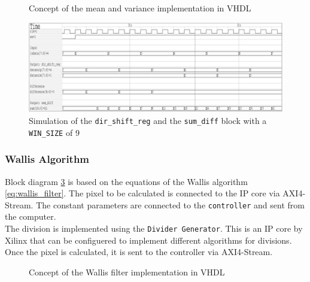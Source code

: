 \begin{figure}[tb!]
    \centering
    \begin{adjustbox}{max width=\textwidth, keepaspectratio}
        
    \end{adjustbox}
    \caption{Concept of the mean and variance implementation in VHDL}
    \label{fig:mean_var_vhdl}
\end{figure}

\begin{figure}[tb!]
    \centering
    \includegraphics[width=\textwidth]
    {images/image_processing/dir_shift_sum_diff.png}
    \caption{Simulation of the \texttt{dir\_shift\_reg} and the
    \texttt{sum\_diff} block with a \texttt{WIN\_SIZE} of 9}
    \label{fig:sim_shift_sum}
\end{figure}


\subsubsection*{Wallis Algorithm}
Block diagram \ref{fig:wallis_vhdl} is based on the equations of the Wallis algorithm \ref{eq:wallis_filter}.
The pixel to be calculated is connected to the IP core via AXI4-Stream. The constant parameters are connected to the \texttt{controller} and sent from the computer. \\
The division is implemented using the \texttt{Divider Generator}. This is an IP
core
by Xilinx that can be configuered to implement different algorithms for
divisions. Once the pixel is calculated, it is sent to the controller via AXI4-Stream.

\begin{figure}[tb!]
    \centering
    \begin{adjustbox}{max width=\textwidth}
        
    \end{adjustbox}
    \caption{Concept of the Wallis filter implementation in VHDL}
    \label{fig:wallis_vhdl}
\end{figure}

